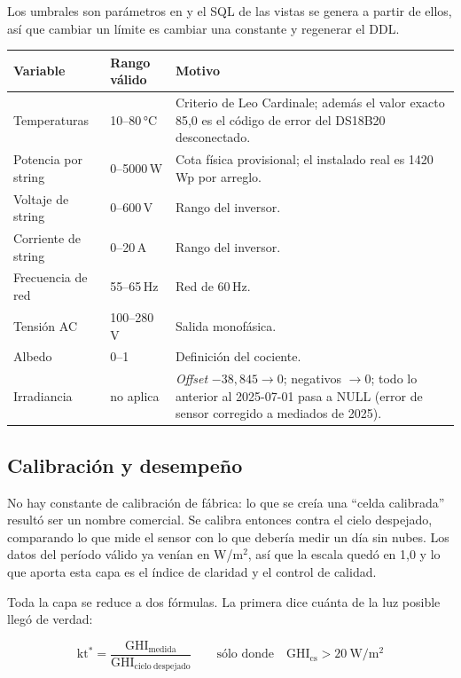 Los umbrales son parámetros en  y el SQL de las vistas se genera a partir
de ellos, así que cambiar un límite es cambiar una constante y regenerar el DDL.

\begin{center}
\small
\begin{tabular}{@{}p{40mm}p{34mm}p{62mm}@{}}
\toprule
\textbf{Variable} & \textbf{Rango válido} & \textbf{Motivo} \\
\midrule
Temperaturas & 10--80\,°C & Criterio de Leo Cardinale; además el valor exacto 85{,}0
  es el código de error del DS18B20 desconectado. \\
Potencia por string & 0--5000\,W & Cota física provisional; el instalado real es
  1420\,Wp por arreglo. \\
Voltaje de string & 0--600\,V & Rango del inversor. \\
Corriente de string & 0--20\,A & Rango del inversor. \\
Frecuencia de red & 55--65\,Hz & Red de 60\,Hz. \\
Tensión AC & 100--280\,V & Salida monofásica. \\
Albedo & 0--1 & Definición del cociente. \\
Irradiancia & no aplica & \emph{Offset} $-38{,}845 \to 0$; negativos $\to 0$; todo lo anterior al
  2025-07-01 pasa a NULL (error de sensor corregido a mediados de 2025). \\
\bottomrule
\end{tabular}
\end{center}

\subsection{Calibración y desempeño}

No hay constante de calibración de fábrica: lo que se creía una ``celda calibrada'' resultó
ser un nombre comercial. Se calibra entonces contra el cielo despejado, comparando lo que
mide el sensor con lo que debería medir un día sin nubes. Los datos del período válido ya
venían en W/m$^2$, así que la escala quedó en 1{,}0 y lo que aporta esta capa es el índice
de claridad y el control de calidad.

Toda la capa se reduce a dos fórmulas. La primera dice cuánta de la luz posible llegó
de verdad:

\begin{equation*}
  \mathrm{kt^*} = \frac{\mathrm{GHI_{medida}}}{\mathrm{GHI_{cielo\ despejado}}}
  \qquad\text{sólo donde}\quad \mathrm{GHI_{cs}} > 20\ \mathrm{W/m^2}
\end{equation*}

